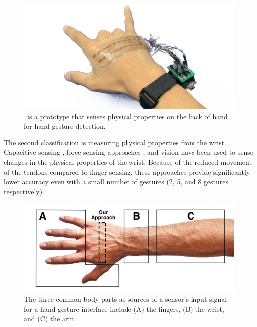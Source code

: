 \documentclass{sigchi}
\begin{document}
\begin{figure}
  \begin{center}
  \includegraphics[width=1\columnwidth]{figures/BackHand.jpg}
  \caption{\getTitleName\ is a prototype that senses physical properties on the back of hand for hand gesture detection.}
  \label{fig:FIGURE1}
  \end{center}
\end{figure}

The second classification is measuring physical properties from the wrist. Capacitive sensing \cite{Rekimoto:2001:GGU:580581.856565}, force sensing approaches \cite{Dementyev:2014:WLG:2642918.2647396}, and vision \cite{Fukui:2011:HSC:2030112.2030154} have been used to sense changes in the physical properties of the wrist. Because of the reduced movement of the tendons compared to finger sensing, these approaches provide significantly lower accuracy even with a small number of gestures (2, 5, and 8 gestures respectively).

\begin{figure}[b]
  \begin{center}
  \includegraphics[width=1\columnwidth]{figures/HandTarget.jpg}
  \caption{The three common body parts as sources of a sensor's input signal for a hand gesture interface include (A) the fingers, (B) the wrist, and (C) the arm.}
  \label{fig:HandTarget}
  \end{center}
\end{figure}
\end{document}
